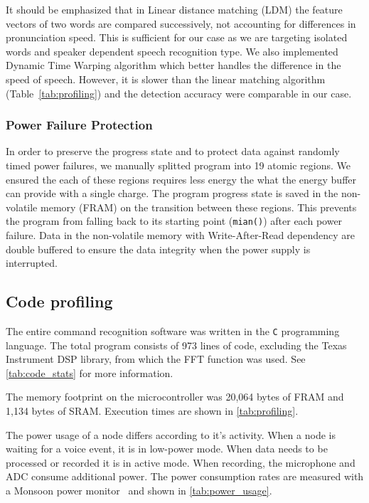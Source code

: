 It should be emphasized that in Linear distance matching (LDM) the feature vectors of two words are compared successively, not accounting for differences in pronunciation speed. This is sufficient for our case as we are targeting isolated words and speaker dependent speech recognition type. We also implemented Dynamic Time Warping algorithm which better handles the difference in the speed of speech. However, it is slower than the linear matching algorithm  (Table~\ref{tab:profiling}) and the detection accuracy were comparable in our case.%

\subsubsection{Power Failure Protection}
In order to preserve the progress state and to protect \cim data against randomly timed power failures, we manually splitted \cim program into 19 atomic regions. We ensured the each of these regions requires less energy the what the energy buffer can provide with a single charge. The program progress state is saved in the non-volatile memory (FRAM) on the transition between these regions. This prevents the program from falling back to its starting point (\texttt{mian()}) after each power failure. Data in the non-volatile memory with Write-After-Read dependency are double buffered to ensure the data integrity when the power supply is interrupted. 

\subsection{Code profiling}
The entire command recognition software was written in the {\tt C} programming language. The total program consists of 973 lines of code, excluding the Texas Instrument DSP library, from which the FFT function was used. See \ref{tab:code_stats} for more information.

The memory footprint on the microcontroller was 20,064 bytes of FRAM and 1,134 bytes of SRAM. Execution times are shown in \ref{tab:profiling}.

The power usage of a node differs according to it's activity. When a node is waiting for a voice event, it is in low-power mode. When data needs to be processed or recorded it is in active mode. When recording, the microphone and ADC consume additional power. The power consumption rates are measured with a Monsoon power monitor~\cite{monsoon} and shown in \ref{tab:power_usage}.


